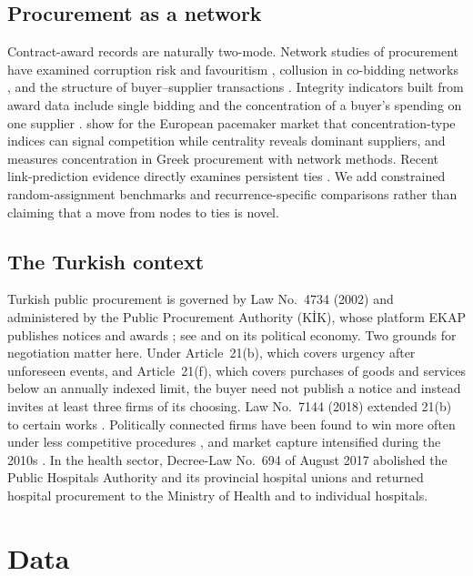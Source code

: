 \documentclass[pdflatex,sn-apa]{sn-jnl}
\begin{document}
\subsection{Procurement as a network}
Contract-award records are naturally two-mode. Network studies of procurement have examined corruption risk and favouritism \citep{wachs2019corr,FazekasWachs2020}, collusion in co-bidding networks \citep{wachs2019cartel,ReevesLatourMorselli2017}, and the structure of buyer--supplier transactions \citep{Popa2019}. Integrity indicators built from award data include single bidding and the concentration of a buyer's spending on one supplier \citep{fazekas2016objective,FazekasKocsis2020,Fazekas2024GlobalPP}. \citet{Fountoukidis2023} show for the European pacemaker market that concentration-type indices can signal competition while centrality reveals dominant suppliers, and \citet{Pliatsidis2024} measures concentration in Greek procurement with network methods. Recent link-prediction evidence directly examines persistent ties \citep{FountoukidisPredictability2026}. We add constrained random-assignment benchmarks and recurrence-specific comparisons rather than claiming that a move from nodes to ties is novel.

\subsection{The Turkish context}
Turkish public procurement is governed by Law No.~4734 (2002) and administered by the Public Procurement Authority (KİK), whose platform EKAP publishes notices and awards \citep{alsac2017}; see \citet{BugraSavaskan2014} and \citet{Gurakar2016} on its political economy. Two grounds for negotiation matter here. Under Article~21(b), which covers urgency after unforeseen events, and Article~21(f), which covers purchases of goods and services below an annually indexed limit, the buyer need not publish a notice and instead invites at least three firms of its choosing. Law No.~7144 (2018) extended 21(b) to certain works \citep{Alyanak2022}. Politically connected firms have been found to win more often under less competitive procedures \citep{Gurakar2016,GurakarBircan2019}, and market capture intensified during the 2010s \citep{KutlayYildirim2024}. In the health sector, Decree-Law No.~694 of August 2017 abolished the Public Hospitals Authority and its provincial hospital unions and returned hospital procurement to the Ministry of Health and to individual hospitals.

\section{Data}\label{sec:data}
\end{document}

